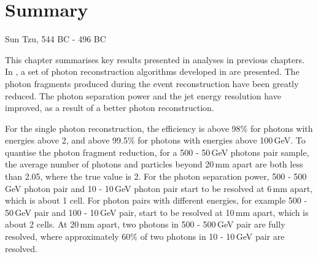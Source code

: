 \chapter{Summary}
\label{chap:summary}



%
{Sun Tzu, 544 BC - 496 BC}




This chapter summarises key results presented in analyses in previous chapters. In , a set of photon reconstruction algorithms developed in \pandora are presented. The photon fragments produced during the event reconstruction have been greatly reduced. The photon separation power and the jet energy resolution have improved, as a result of a better photon reconstruction.

For the single photon reconstruction, the efficiency is above 98\% for photons with energies above 2\GeV, and above 99.5\% for photons with energies above 100\,GeV. To quantise the photon fragment reduction, for a  500 - 50\,GeV photons pair sample, the average number of photons and particles beyond 20\,mm apart are both less than 2.05, where the true value is 2. For the photon separation power, 500 - 500\,GeV photon pair and 10 - 10\,GeV photon pair start to be resolved at 6\,mm apart, which is about 1 \ECAL cell. For photon pairs with different energies,  for example 500 - 50\,GeV pair and  100 - 10\,GeV pair, start to be resolved at 10\,mm apart, which is about 2 \ECAL cells. At 20\,mm apart, two photons in  500 - 500\,GeV pair are fully resolved, where approximately 60\% of two photons in 10 - 10\,GeV pair are resolved.

